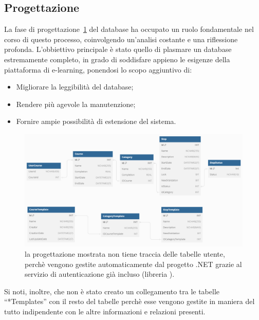 \subsection{Progettazione}
La fase di progettazione~\ref{fig:progettazione_database} del database ha occupato un ruolo
fondamentale nel corso di questo processo, coinvolgendo un'analisi costante e
una riflessione profonda. L'obbiettivo principale è stato quello di plasmare un
database estremamente completo, in grado di soddisfare appieno le esigenze
della piattaforma di e-learning, ponendosi lo scopo aggiuntivo di:
\begin{itemize}
	\item Migliorare la leggibilità del database;
	\item Rendere più agevole la manutenzione;
	\item Fornire ampie possibilità di estensione del sistema.
\end{itemize}
\begin{figure}[H]
	\centering
	\includegraphics[width=\textwidth]{img/progettazione_database.png}
	\caption[progettazione del database]{la progettazione mostrata non tiene traccia delle tabelle utente, perchè vengono
	gestite automaticamente dal progetto .NET grazie al servizio di autenticazione già
	incluso (libreria ).}
	\label{fig:progettazione_database}
\end{figure}
%
Si noti, inoltre, che non è stato creato un collegamento tra le tabelle “*Templates” con il resto del tabelle
perchè esse vengono gestite in maniera del tutto indipendente con le altre informazioni e relazioni presenti.
